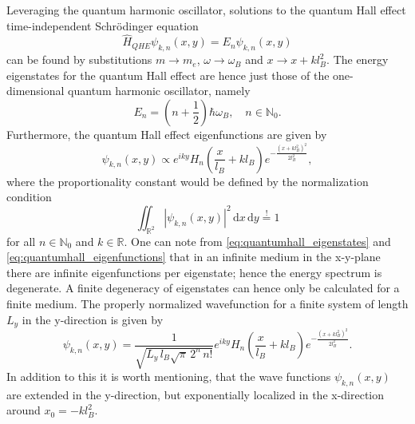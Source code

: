 \documentclass{report}
\numberwithin{tm}{section}
\begin{document}
Leveraging the quantum harmonic oscillator, solutions to the quantum Hall effect time-independent Schrödinger equation \begin{equation}
	\hat{H}_{QHE}\psi_{k,n}(x,y) = E_n\psi_{k,n}(x,y)
\end{equation} can be found by substitutions $m \rightarrow m_e$, $\omega \rightarrow \omega_B$ and $x \rightarrow x + kl_B^2$. The energy eigenstates for the quantum Hall effect are hence just those of the one-dimensional quantum harmonic oscillator, namely \begin{equation}\label{eq:quantumhall_eigenstates}
E_n = \left(n+\frac{1}{2}\right)\hbar \omega_B, \quad n \in \mathbb{N}_0.
\end{equation} Furthermore, the quantum Hall effect eigenfunctions are given by \begin{equation}
\psi_{k,n}(x,y) \propto e^{iky}H_n\left(\frac{x}{l_B} + kl_B\right)e^{-\frac{(x+kl_B^2)^2}{2l_B^2}},
\end{equation} where the proportionality constant would be defined by the normalization condition \begin{equation}
\iint_{\mathbb{R}^2}|\psi_{k,n}(x,y)|^2\,\mathrm{d}x\,\mathrm{d}y \overset{!}{=} 1
\end{equation} for all $n \in \mathbb{N}_0$ and $k \in \mathbb{R}$. One can note from \cref{eq:quantumhall_eigenstates} and \cref{eq:quantumhall_eigenfunctions} that in an infinite medium in the x-y-plane there are infinite eigenfunctions per eigenstate; hence the energy spectrum is degenerate. A finite degeneracy of eigenstates can hence only be calculated for a finite medium. The properly normalized wavefunction for a finite system of length $L_y$ in the y-direction is given by \begin{equation}\label{eq:quantumhall_eigenfunctions}
\psi_{k,n}(x,y) = \frac{1}{\sqrt{L_y \, l_B \sqrt{\pi} \, 2^n \, n!}} e^{iky} H_n\left(\frac{x}{l_B} + kl_B\right) e^{-\frac{(x+kl_B^2)^2}{2l_B^2}}.
\end{equation} In addition to this it is worth mentioning, that the wave functions $\psi_{k,n}(x,y)$ are extended in the y-direction, but exponentially localized in the x-direction around $x_0 = -kl_B^2$.
\end{document}
